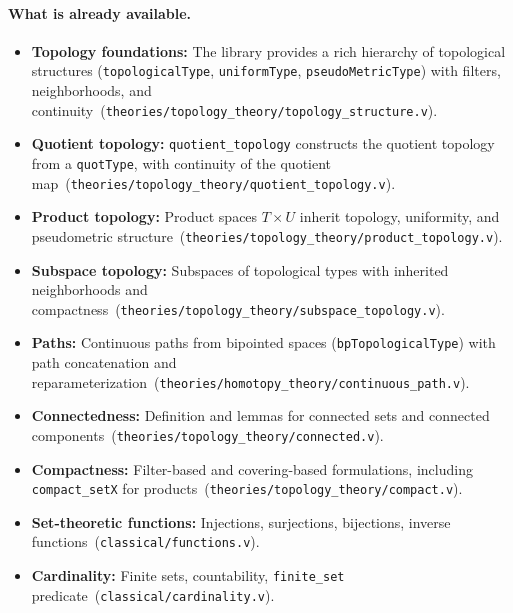 \documentclass[11pt,a4paper]{article}
\theoremstyle{definition}
\theoremstyle{remark}
\begin{document}
\paragraph{What is already available.}
\begin{itemize}
  \item \textbf{Topology foundations:} The library provides a rich hierarchy of topological structures (\texttt{topologicalType}, \texttt{uniformType}, \texttt{pseudoMetricType}) with filters, neighborhoods, and continuity~(\texttt{theories/topology\_theory/topology\_structure.v}).
  \item \textbf{Quotient topology:} \texttt{quotient\_topology} constructs the quotient topology from a \texttt{quotType}, with continuity of the quotient map~(\texttt{theories/topology\_theory/quotient\_topology.v}).
  \item \textbf{Product topology:} Product spaces \(T\times U\) inherit topology, uniformity, and pseudometric structure~(\texttt{theories/topology\_theory/product\_topology.v}).
  \item \textbf{Subspace topology:} Subspaces of topological types with inherited neighborhoods and compactness~(\texttt{theories/topology\_theory/subspace\_topology.v}).
  \item \textbf{Paths:} Continuous paths from bipointed spaces (\texttt{bpTopologicalType}) with path concatenation and reparameterization~(\texttt{theories/homotopy\_theory/continuous\_path.v}).
  \item \textbf{Connectedness:} Definition and lemmas for connected sets and connected components~(\texttt{theories/topology\_theory/connected.v}).
  \item \textbf{Compactness:} Filter-based and covering-based formulations, including \texttt{compact\_setX} for products~(\texttt{theories/topology\_theory/compact.v}).
  \item \textbf{Set-theoretic functions:} Injections, surjections, bijections, inverse functions~(\texttt{classical/functions.v}).
  \item \textbf{Cardinality:} Finite sets, countability, \texttt{finite\_set} predicate~(\texttt{classical/cardinality.v}).
\end{itemize}
\end{document}
